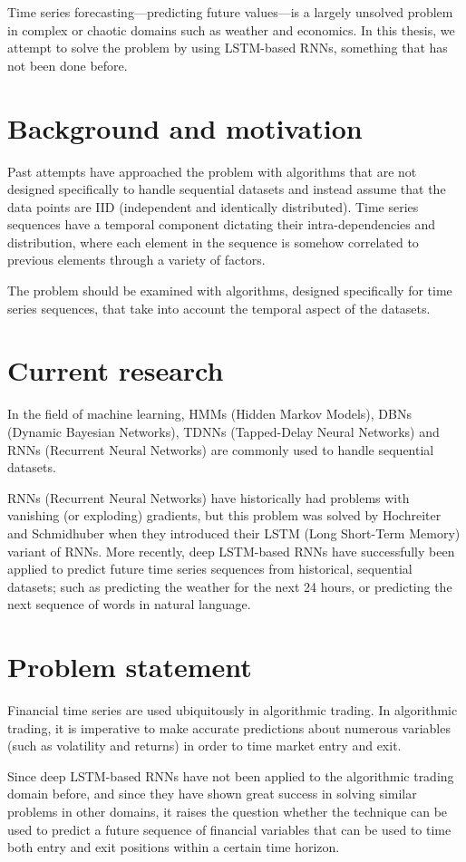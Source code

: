 Time series forecasting---predicting future values---is a largely unsolved problem in complex or chaotic domains such as weather and economics. In this thesis, we attempt to solve the problem by using LSTM-based RNNs, something that has not been done before.

\section{Background and motivation}
Past attempts have approached the problem with algorithms that are not designed specifically to handle sequential datasets and instead assume that the data points are IID (independent and identically distributed). Time series sequences have a temporal component dictating their intra-dependencies and distribution, where each element in the sequence is somehow correlated to previous elements through a variety of factors.

The problem should be examined with algorithms, designed specifically for time series sequences, that take into account the temporal aspect of the datasets.

\section{Current research}
In the field of machine learning, HMMs (Hidden Markov Models), DBNs (Dynamic Bayesian Networks), TDNNs (Tapped-Delay Neural Networks) and RNNs (Recurrent Neural Networks) are commonly used to handle sequential datasets.

RNNs (Recurrent Neural Networks) have historically had problems with vanishing (or exploding) gradients, but this problem was solved by Hochreiter and Schmidhuber when they introduced their LSTM (Long Short-Term Memory) variant of RNNs. More recently, deep LSTM-based RNNs have successfully been applied to predict future time series sequences from historical, sequential datasets; such as predicting the weather for the next 24 hours, or predicting the next sequence of words in natural language.

\newpage
\section{Problem statement}
Financial time series are used ubiquitously in algorithmic trading. In algorithmic trading, it is imperative to make accurate predictions about numerous variables (such as volatility and returns) in order to time market entry and exit.

Since deep LSTM-based RNNs have not been applied to the algorithmic trading domain before, and since they have shown great success in solving similar problems in other domains, it raises the question whether the technique can be used to predict a future sequence of financial variables that can be used to time both entry and exit positions within a certain time horizon.
